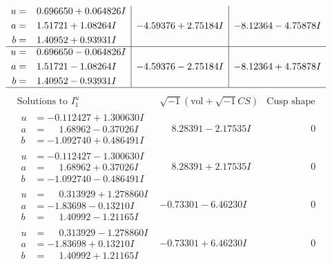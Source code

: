 \documentclass[1p]{elsarticle_modified}
\theoremstyle{definition}
\newcommand{\I}{\sqrt{-1}}
\begin{document}
$$\begin{array}{c|c|c}
\begin{aligned}
u &= \phantom{-}0.696650 + 0.064826 I \\
a &= \phantom{-}1.51721 + 1.08264 I \\
b &= \phantom{-}1.40952 + 0.93931 I\end{aligned}
 & -4.59376 + 2.75184 I & -8.12364 - 4.75878 I \\ \hline\begin{aligned}
u &= \phantom{-}0.696650 - 0.064826 I \\
a &= \phantom{-}1.51721 - 1.08264 I \\
b &= \phantom{-}1.40952 - 0.93931 I\end{aligned}
 & -4.59376 - 2.75184 I & -8.12364 + 4.75878 I\\
 \hline 
 \end{array}$$\newpage$$\begin{array}{c|c|c}  
\text{Solutions to }I^u_{1}& \I (\text{vol} + \sqrt{-1}CS) & \text{Cusp shape}\\
 \hline 
\begin{aligned}
u &= -0.112427 + 1.300630 I \\
a &= \phantom{-}1.68962 - 0.37026 I \\
b &= -1.092740 + 0.486491 I\end{aligned}
 & \phantom{-}8.28391 - 2.17535 I & \phantom{-0.000000 } 0 \\ \hline\begin{aligned}
u &= -0.112427 - 1.300630 I \\
a &= \phantom{-}1.68962 + 0.37026 I \\
b &= -1.092740 - 0.486491 I\end{aligned}
 & \phantom{-}8.28391 + 2.17535 I & \phantom{-0.000000 } 0 \\ \hline\begin{aligned}
u &= \phantom{-}0.313929 + 1.278860 I \\
a &= -1.83698 - 0.13210 I \\
b &= \phantom{-}1.40992 - 1.21165 I\end{aligned}
 & -0.73301 - 6.46230 I & \phantom{-0.000000 } 0 \\ \hline\begin{aligned}
u &= \phantom{-}0.313929 - 1.278860 I \\
a &= -1.83698 + 0.13210 I \\
b &= \phantom{-}1.40992 + 1.21165 I\end{aligned}
 & -0.73301 + 6.46230 I & \phantom{-0.000000 } 0 \\ \hline\begin{aligned}

\end{aligned}
\end{array}$$
\end{document}
